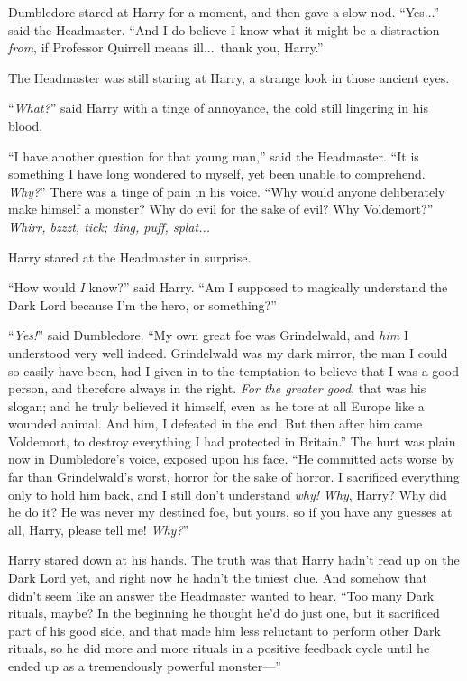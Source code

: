 Dumbledore stared at Harry for a moment, and then gave a slow nod. “Yes...” said the Headmaster. “And I do believe I know what it might be a distraction \emph{from}, if Professor Quirrell means ill...\ thank you, Harry.”

The Headmaster was still staring at Harry, a strange look in those ancient eyes.

“\emph{What?}” said Harry with a tinge of annoyance, the cold still lingering in his blood.

“I have another question for that young man,” said the Headmaster. “It is something I have long wondered to myself, yet been unable to comprehend. \emph{Why?}” There was a tinge of pain in his voice. “Why would anyone deliberately make himself a monster? Why do evil for the sake of evil? Why Voldemort?”
\sbreak
\emph{Whirr, bzzzt, tick; ding, puff, splat...}

Harry stared at the Headmaster in surprise.

“How would \emph{I} know?” said Harry. “Am I supposed to magically understand the Dark Lord because I’m the hero, or something?”

“\emph{Yes!}” said Dumbledore. “My own great foe was Grindelwald, and \emph{him} I understood very well indeed. Grindelwald was my dark mirror, the man I could so easily have been, had I given in to the temptation to believe that I was a good person, and therefore always in the right. \emph{For the greater good}, that was his slogan; and he truly believed it himself, even as he tore at all Europe like a wounded animal. And him, I defeated in the end. But then after him came Voldemort, to destroy everything I had protected in Britain.” The hurt was plain now in Dumbledore’s voice, exposed upon his face. “He committed acts worse by far than Grindelwald’s worst, horror for the sake of horror. I sacrificed everything only to hold him back, and I still don’t understand \emph{why!} \emph{Why}, Harry? Why did he do it? He was never my destined foe, but yours, so if you have any guesses at all, Harry, please tell me! \emph{Why?}”

Harry stared down at his hands. The truth was that Harry hadn’t read up on the Dark Lord yet, and right now he hadn’t the tiniest clue. And somehow that didn’t seem like an answer the Headmaster wanted to hear. “Too many Dark rituals, maybe? In the beginning he thought he’d do just one, but it sacrificed part of his good side, and that made him less reluctant to perform other Dark rituals, so he did more and more rituals in a positive feedback cycle until he ended up as a tremendously powerful monster—”

